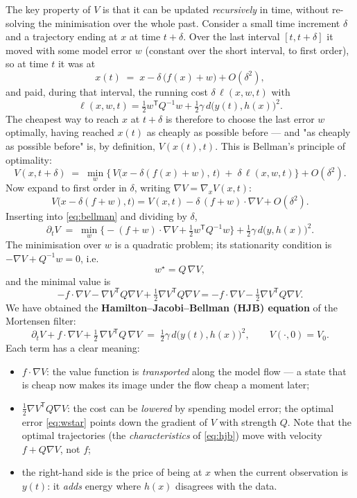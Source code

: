 \documentclass[11pt,a4paper]{article}
\newcommand{\T}{^{\mathsf T}}
\newcommand{\grad}{\nabla}
\theoremstyle{plain}
\theoremstyle{definition}
\theoremstyle{remark}
\begin{document}
The key property of $V$ is that it can be updated \emph{recursively} in time, without re-solving the minimisation over the whole past. Consider a small time increment $\delta$ and a trajectory ending at $x$ at time $t+\delta$. Over the last interval $[t,t+\delta]$ it moved with some model error $w$ (constant over the short interval, to first order), so at time $t$ it was at
\[
  x(t) \;=\; x - \delta\,\big(f(x)+w\big) + O(\delta^2),
\]
and paid, during that interval, the running cost $\delta\,\ell(x,w,t)$ with
\[
  \ell(x,w,t) = \tfrac12 w\T Q^{-1}w + \tfrac12\gamma\, d\big(y(t),h(x)\big)^2 .
\]
The cheapest way to reach $x$ at $t+\delta$ is therefore to choose the last error $w$ optimally, having reached $x(t)$ as cheaply as possible before --- and "as cheaply as possible before" is, by definition, $V(x(t),t)$. This is Bellman's principle of optimality:
\begin{equation}
  V(x,t+\delta) \;=\; \min_{w}\Big\{\, V\big(x-\delta(f(x)+w),\,t\big) \;+\; \delta\,\ell(x,w,t) \Big\} + O(\delta^2).
  \label{eq:bellman}
\end{equation}
Now expand to first order in $\delta$, writing $\grad V=\grad_x V(x,t)$:
\[
  V\big(x-\delta(f+w),t\big) = V(x,t) - \delta\,(f+w)\cdot\grad V + O(\delta^2).
\]
Inserting into \eqref{eq:bellman} and dividing by $\delta$,
\begin{equation}
  \partial_t V \;=\; \min_{w}\Big\{ -(f+w)\cdot\grad V + \tfrac12 w\T Q^{-1} w \Big\} + \tfrac12\gamma\, d\big(y,h(x)\big)^2 .
  \label{eq:min_w}
\end{equation}
The minimisation over $w$ is a quadratic problem; its stationarity condition is $-\grad V + Q^{-1}w = 0$, i.e.
\begin{equation}
  w^\star = Q\,\grad V ,
  \label{eq:wstar}
\end{equation}
and the minimal value is
\[
  -f\cdot\grad V - \grad V\T Q\grad V + \tfrac12 \grad V\T Q \grad V = -f\cdot\grad V - \tfrac12\grad V\T Q\grad V .
\]
We have obtained the \textbf{Hamilton--Jacobi--Bellman (HJB) equation} of the Mortensen filter:
\begin{equation}
  \boxed{\;
  \partial_t V + f\cdot\grad V + \tfrac12\,\grad V\T Q\,\grad V \;=\; \tfrac12\gamma\, d\big(y(t),h(x)\big)^2,
  \qquad V(\cdot,0)=V_0 .\;}
  \label{eq:hjb}
\end{equation}
Each term has a clear meaning:
\begin{itemize}[nosep]
  \item $f\cdot\grad V$: the value function is \emph{transported} along the model flow --- a state that is cheap now makes its image under the flow cheap a moment later;
  \item $\tfrac12\grad V\T Q\grad V$: the cost can be \emph{lowered} by spending model error; the optimal error \eqref{eq:wstar} points down the gradient of $V$ with strength $Q$. Note that the optimal trajectories (the \emph{characteristics} of \eqref{eq:hjb}) move with velocity $f + Q\grad V$, not $f$;
  \item the right-hand side is the price of being at $x$ when the current observation is $y(t)$: it \emph{adds} energy where $h(x)$ disagrees with the data.
\end{itemize}
\end{document}
